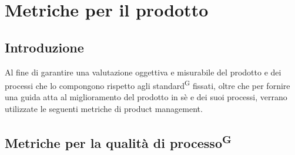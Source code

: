\documentclass[8pt]{article}
\newcommand{\glossterm}[1]{#1\textsuperscript{G}} %
\begin{document}
\section{Metriche per il prodotto} \label{sec:metriche_prodotto}

\subsection{Introduzione}
Al fine di garantire una valutazione oggettiva e misurabile del prodotto e dei processi che lo compongono rispetto agli \glossterm{standard} fissati, oltre che per fornire una guida atta al miglioramento del prodotto in sè e dei suoi processi, verrano utilizzate le seguenti metriche di product management. 

\subsection{Metriche per la qualità di \glossterm{processo}}
\end{document}
